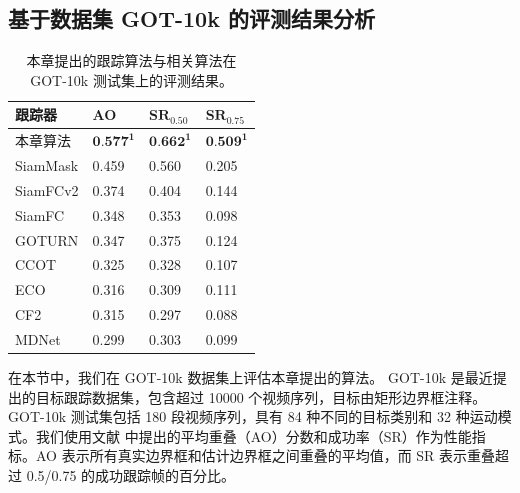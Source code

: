 
\subsection{基于数据集 GOT-10k 的评测结果分析}
\begin{table}[t]
\centering
\caption{本章提出的跟踪算法与相关算法在 GOT-10k \cite{GOT-10k} 测试集上的评测结果。}
\begin{tabular}{l l l l}
\bottomrule
跟踪器   &  AO   &  $\textbf{SR}_{0.50}$ & $\textbf{SR}_{0.75}$  \\
\hline
本章算法 &  $\textbf{0.577}^\textbf{1}$ & $\textbf{0.662}^\textbf{1}$  & $\textbf{0.509}^\textbf{1}$  \\
SiamMask \cite{Wang2018SiamMask} &  0.459&  0.560 &0.205 \\
SiamFCv2 \cite{valmadre2017end} &  0.374&  0.404 &0.144 \\
SiamFC \cite{SiamFC}  &  0.348&  0.353 &0.098 \\
GOTURN \cite{GOTURN} &  0.347&  0.375 &0.124 \\
CCOT	 \cite{CCOT} &  0.325&  0.328 &0.107 \\
ECO \cite{danelljan2017eco} &  0.316&  0.309 &0.111 \\
CF2 \cite{CF2} &  0.315&  0.297 &0.088 \\
MDNet \cite{MDNet} &  0.299&  0.303 &0.099 \\
\bottomrule
\end{tabular}
\label{table:end_got10k}
\end{table}
在本节中，我们在 GOT-10k \cite{GOT-10k} 数据集上评估本章提出的算法。
GOT-10k 是最近提出的目标跟踪数据集，包含超过 10000 个视频序列，目标由矩形边界框注释。
GOT-10k 测试集包括 180 段视频序列，具有 84 种不同的目标类别和 32 种运动模式。我们使用文献 \cite{GOT-10k} 中提出的平均重叠（AO）分数和成功率（SR）作为性能指标。AO 表示所有真实边界框和估计边界框之间重叠的平均值，而 SR 表示重叠超过 0.5/0.75 的成功跟踪帧的百分比。

